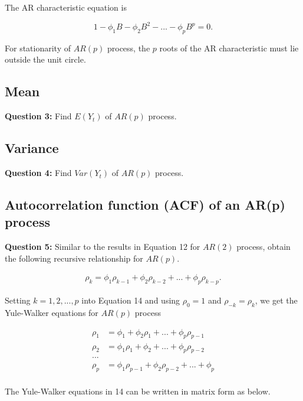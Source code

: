 \documentclass[
  11pt,
  a4paper,
]{report}
\begin{document}
The AR characteristic equation is

\[1-\phi_1B-\phi_2B^2-...-\phi_pB^p=0.\]

For stationarity of \(AR(p)\) process, the \(p\) roots of the AR
characteristic must lie outside the unit circle.

\subsection{Mean}\label{mean-2}

\textbf{Question 3: } Find \(E(Y_t)\) of \(AR(p)\) process.

\subsection{Variance}\label{variance-1}

\textbf{Question 4: } Find \(Var(Y_t)\) of \(AR(p)\) process.

\subsection{Autocorrelation function (ACF) of an AR(p)
process}\label{autocorrelation-function-acf-of-an-arp-process}

\textbf{Question 5: } Similar to the results in Equation 12 for
\(AR(2)\) process, obtain the following recursive relationship for
\(AR(p)\).

\begin{align}
\rho_k = \phi_1\rho_{k-1}+\phi_2 \rho_{k-2} + ... + \phi_p \rho_{k-p}.
\end{align}

Setting \(k=1, 2, ..., p\) into Equation 14 and using \(\rho_0=1\) and
\(\rho_{-k}=\rho_k\), we get the Yule-Walker equations for \(AR(p)\)
process

\begin{equation}
\begin{aligned}
  \rho_1 &= \phi_1+\phi_2 \rho_{1} + ... + \phi_p \rho_{p-1}\\
  \rho_2 &= \phi_1 \rho_1+\phi_2  + ... + \phi_p \rho_{p-2}\\
  ... \\
  \rho_p &= \phi_1 \rho_{p-1} +\phi_2 \rho_{p-2}  + ... + \phi_p \\
\end{aligned}
\end{equation}

The Yule-Walker equations in 14 can be written in matrix form as below.
\end{document}
